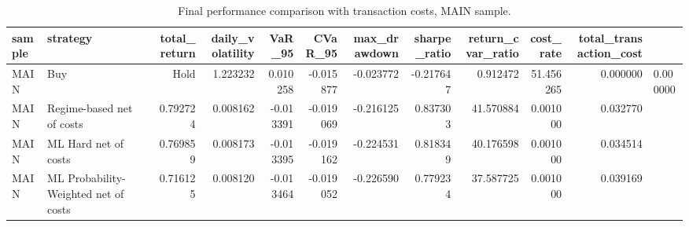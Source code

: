 \begin{table}
\caption{Final performance comparison with transaction costs, MAIN sample.}
\label{tab:final_performance_metrics_with_costs_main}
\begin{tabular}{llrrrrrrrrr}
\toprule
sample & strategy & total_return & daily_volatility & VaR_95 & CVaR_95 & max_drawdown & sharpe_ratio & return_cvar_ratio & cost_rate & total_transaction_cost \\
\midrule
MAIN & Buy & Hold & 1.223232 & 0.010258 & -0.015877 & -0.023772 & -0.217647 & 0.912472 & 51.456265 & 0.000000 & 0.000000 \\
MAIN & Regime-based net of costs & 0.792724 & 0.008162 & -0.013391 & -0.019069 & -0.216125 & 0.837303 & 41.570884 & 0.001000 & 0.032770 \\
MAIN & ML Hard net of costs & 0.769859 & 0.008173 & -0.013395 & -0.019162 & -0.224531 & 0.818349 & 40.176598 & 0.001000 & 0.034514 \\
MAIN & ML Probability-Weighted net of costs & 0.716125 & 0.008120 & -0.013464 & -0.019052 & -0.226590 & 0.779234 & 37.587725 & 0.001000 & 0.039169 \\
\bottomrule
\end{tabular}
\end{table}
